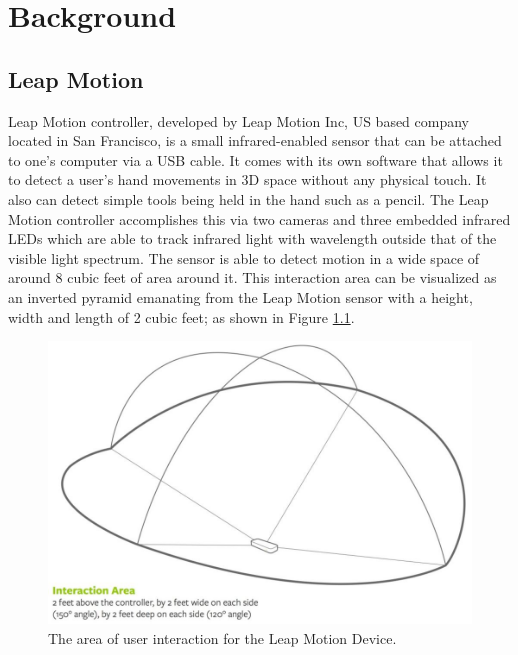 \chapter{Background}

\label{Chapter2_background} 

\section{Leap Motion}
Leap Motion controller, developed by Leap Motion Inc, US based company located in San Francisco, is a small infrared-enabled sensor that can be attached to one’s computer via a USB cable. It comes with its own software that allows it to detect a user’s hand movements in 3D space without any physical touch. It also can detect simple tools being held in the hand such as a pencil. The Leap Motion controller accomplishes this via two cameras and three embedded infrared LEDs which are able to track infrared light with wavelength outside that of the visible light spectrum. The sensor is able to detect motion in a wide space of around 8 cubic feet of area around it. This interaction area can be visualized as an inverted pyramid emanating from the Leap Motion sensor with a height, width and length of 2 cubic feet; as shown in Figure \ref{fig:LeapInteractionArea}.
\begin{figure}[th]
\centering
\includegraphics[scale=0.35]{Figures/LeapInteractionArea.JPG}
\caption[Leap Motion interaction area]{The area of user interaction for the Leap Motion Device.}
\label{fig:LeapInteractionArea}
\end{figure}

